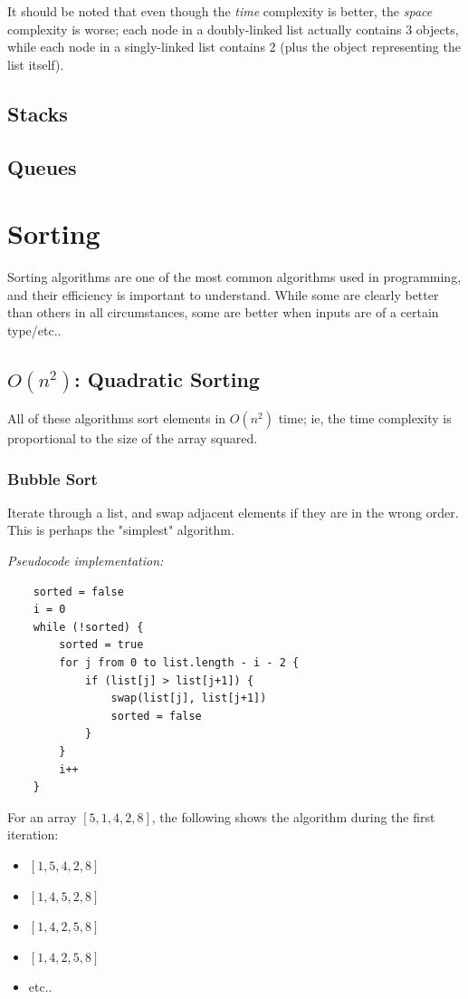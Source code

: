 \documentclass[12pt]{article}
\begin{document}
It should be noted that even though the \textit{time} complexity is better, the \textit{space} complexity is worse; each node in a doubly-linked list actually contains 3 objects, while each node in a singly-linked list contains 2 (plus the object representing the list itself).

\subsection{Stacks}
\subsection{Queues}


\section{Sorting}
Sorting algorithms are one of the most common algorithms used in programming, and their efficiency is important to understand. While some are clearly better than others in all circumstances, some are better when inputs are of a certain type/etc..

\subsection{$O(n^2)$: Quadratic Sorting}
All of these algorithms sort elements in $O(n^2)$ time; ie, the time complexity is proportional to the size of the array squared.

\subsubsection{Bubble Sort}
Iterate through a list, and swap adjacent elements if they are in the wrong order. This is perhaps the "simplest" algorithm.

\textit{Pseudocode implementation:}

\begin{verbatim}
    sorted = false
    i = 0
    while (!sorted) {
        sorted = true
        for j from 0 to list.length - i - 2 {
            if (list[j] > list[j+1]) {
                swap(list[j], list[j+1])
                sorted = false
            }
        }
        i++
    }
\end{verbatim}

For an array $[5,1,4,2,8]$, the following shows the algorithm during the first iteration:

\begin{itemize}
    \item $[1,5,4,2,8]$
    \item $[1,4,5,2,8]$
    \item $[1,4,2,5,8]$
    \item $[1,4,2,5,8]$
    \item etc..
\end{itemize}
\end{document}
